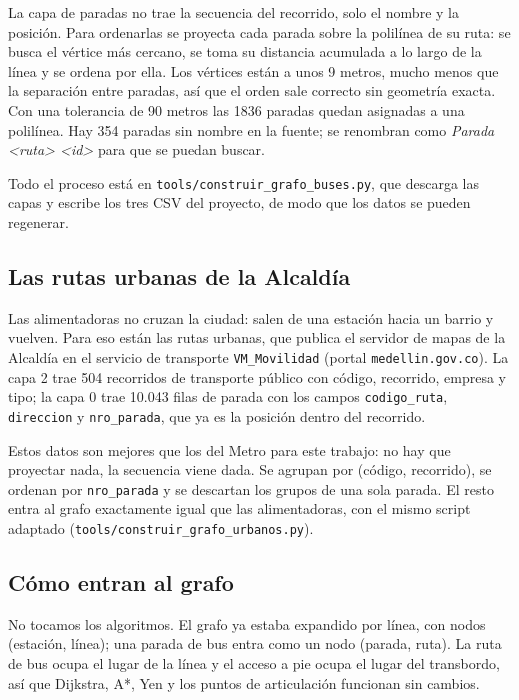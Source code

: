 \documentclass[11pt,a4paper]{article}
\newcommand{\arch}[1]{\texttt{#1}}
\begin{document}
La capa de paradas no trae la secuencia del recorrido, solo el nombre y la
posición. Para ordenarlas se proyecta cada parada sobre la polilínea de su ruta:
se busca el vértice más cercano, se toma su distancia acumulada a lo largo de la
línea y se ordena por ella. Los vértices están a unos 9 metros, mucho menos que
la separación entre paradas, así que el orden sale correcto sin geometría exacta.
Con una tolerancia de 90 metros las 1836 paradas quedan asignadas a una
polilínea. Hay 354 paradas sin nombre en la fuente; se renombran como
\emph{Parada <ruta> <id>} para que se puedan buscar.

Todo el proceso está en \arch{tools/construir\_grafo\_buses.py}, que descarga las
capas y escribe los tres CSV del proyecto, de modo que los datos se pueden
regenerar.

\subsection{Las rutas urbanas de la Alcaldía}

Las alimentadoras no cruzan la ciudad: salen de una estación hacia un barrio y
vuelven. Para eso están las rutas urbanas, que publica el servidor de mapas de la
Alcaldía en el servicio de transporte \arch{VM\_Movilidad} (portal
\arch{medellin.gov.co}). La capa 2 trae 504 recorridos de transporte
público con código, recorrido, empresa y tipo; la capa 0 trae 10.043 filas de
parada con los campos \arch{codigo\_ruta}, \arch{direccion} y \arch{nro\_parada},
que ya es la posición dentro del recorrido.

Estos datos son mejores que los del Metro para este trabajo: no hay que proyectar
nada, la secuencia viene dada. Se agrupan por (código, recorrido), se ordenan por
\arch{nro\_parada} y se descartan los grupos de una sola parada. El resto entra al
grafo exactamente igual que las alimentadoras, con el mismo script adaptado
(\arch{tools/construir\_grafo\_urbanos.py}).

\subsection{Cómo entran al grafo}

No tocamos los algoritmos. El grafo ya estaba expandido por línea, con nodos
(estación, línea); una parada de bus entra como un nodo (parada, ruta). La
ruta de bus ocupa el lugar de la línea y el acceso a pie ocupa el lugar del
transbordo, así que Dijkstra, A*, Yen y los puntos de articulación funcionan sin
cambios.
\end{document}
